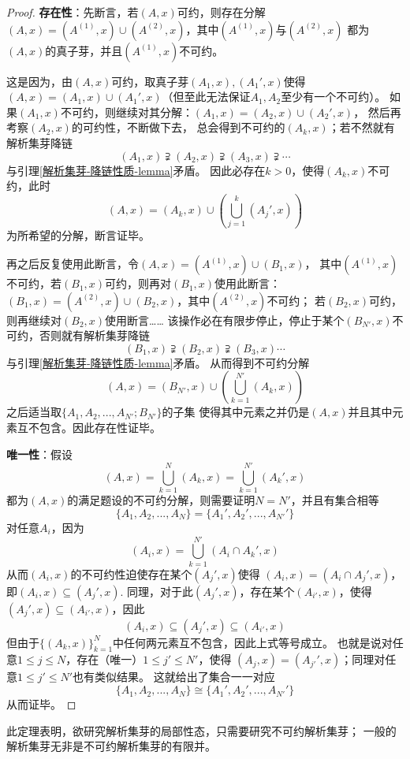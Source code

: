 \begin{proof}
\textbf{存在性}：先断言，若$(A,x)$可约，则存在分解
$(A,x)=(A^{(1)},x)\cup(A^{(2)},x)$，其中$(A^{(1)},x)$与$(A^{(2)},x)$
都为$(A,x)$的真子芽，并且$(A^{(1)},x)$不可约。

这是因为，由$(A,x)$可约，取真子芽$(A_1,x),(A_1',x)$使得
$(A,x)=(A_1,x)\cup (A_1',x)$（但至此无法保证$A_1,A_2$至少有一个不可约）。
如果$(A_1,x)$不可约，则继续对其分解：$(A_1,x)=(A_2,x)\cup(A_2',x)$，
然后再考察$(A_2,x)$的可约性，不断做下去，
总会得到不可约的$(A_k,x)$；若不然就有解析集芽降链
$$(A_1,x)\supsetneqq (A_2,x)\supsetneqq (A_3,x)\supsetneqq\cdots$$
与引理\ref{解析集芽-降链性质-lemma}矛盾。
因此必存在$k>0$，使得$(A_k,x)$不可约，此时
$$(A,x)=(A_k,x)\cup
\left(
  \bigcup_{j=1}^k
    (A_j',x)
\right)
$$
为所希望的分解，断言证毕。

再之后反复使用此断言，令$(A,x)=(A^{(1)},x)\cup (B_1,x)$，
其中$(A^{(1)},x)$不可约，若$(B_1,x)$可约，则再对$(B_1,x)$使用此断言：
$(B_1,x)=(A^{(2)},x)\cup(B_2,x)$，其中$(A^{(2)},x)$不可约；
若$(B_2,x)$可约，则再继续对$(B_2,x)$使用断言……
该操作必在有限步停止，停止于某个$(B_{N'},x)$不可约，否则就有解析集芽降链
$$(B_1,x)\supsetneqq(B_2,x)\supsetneqq(B_3,x)\cdots$$
与引理\ref{解析集芽-降链性质-lemma}矛盾。
从而得到不可约分解
$$(A,x)=(B_{N'},x)\cup
\left(
  \bigcup_{k=1}^{N'}(A_k,x)
\right)
$$
之后适当取$\{A_1,A_2,...,A_{N'};B_{N'}\}$的子集
使得其中元素之并仍是$(A,x)$并且其中元素互不包含。因此存在性证毕。

\textbf{唯一性}：假设
$$(A,x)=\bigcup_{k=1}^N(A_k,x)=\bigcup_{k=1}^{N'}(A_k',x)$$
都为$(A,x)$的满足题设的不可约分解，则需要证明$N=N'$，并且有集合相等
$$\{A_1,A_2,...,A_N\}=\{A_1',A_2',...,A_{N'}'\}$$
对任意$A_i$，因为
$$(A_i,x)=\bigcup_{k=1}^{N'}(A_i\cap A_k',x)$$
从而$(A_i,x)$的不可约性迫使存在某个$(A_j',x)$使得
$(A_i,x)=(A_i\cap A_j',x)$，即$(A_i,x)\subseteq (A_j',x)$.
同理，对于此$(A_j',x)$，存在某个$(A_{i'},x)$，使得
$(A_j',x)\subseteq(A_{i'},x)$，因此
$$(A_i,x)\subseteq(A_j',x)\subseteq(A_{i'},x)$$
但由于$\{(A_k,x)\}_{k=1}^N$中任何两元素互不包含，因此上式等号成立。
也就是说对任意$1\leq j\leq N$，存在（唯一）$1\leq j'\leq N'$，使得
$(A_j,x)=(A_{j'}',x)$；同理对任意$1\leq j'\leq N'$也有类似结果。
这就给出了集合一一对应
$$\{A_1,A_2,...,A_N\}\cong\{A_1',A_2',...,A_{N'}'\}$$
从而证毕。
\end{proof}

\begin{rem}
此定理表明，欲研究解析集芽的局部性态，只需要研究不可约解析集芽；
一般的解析集芽无非是不可约解析集芽的有限并。
\end{rem}














